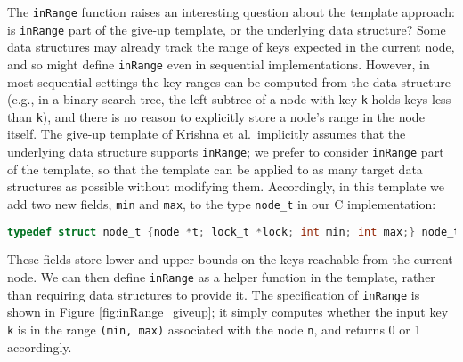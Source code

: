 \documentclass[a4paper,UKenglish,cleveref, autoref, thm-restate]{lipics-v2021}
\newcommand{\wm}[1]{\textbf{\textcolor{violet}{[William: #1]}}}
\begin{document}
The \lstinline{inRange} function raises an interesting question about the template approach: is \lstinline{inRange} part of the give-up template, or the underlying data structure? Some data structures may already track the range of keys expected in the current node, and so might define \lstinline{inRange} even in sequential implementations. However, in most sequential settings the key ranges can be computed from the data structure (e.g., in a binary search tree, the left subtree of a node with key \lstinline{k} holds keys less than \lstinline{k}), and there is no reason to explicitly store a node's range in the node itself. The give-up template of Krishna et al.~implicitly assumes that the underlying data structure supports \lstinline{inRange}; we prefer to consider \lstinline{inRange} part of the template, so that the template can be applied to as many target data structures as possible without modifying them. Accordingly, in this template we add two new fields, \lstinline{min} and \lstinline{max}, to the type \lstinline{node_t} in our C implementation:
\begin{lstlisting}[language = C, backgroundcolor=\color{white}, basicstyle=\ttfamily\footnotesize]
	typedef struct node_t {node *t; lock_t *lock; int min; int max;} node_t;
\end{lstlisting}
These fields store lower and upper bounds on the keys reachable from the current node. %
We can then define \texttt{inRange} as a helper function in the template, rather than requiring data structures to provide it. %
The specification of \lstinline{inRange} is shown in Figure \ref{fig:inRange_giveup}; it simply computes whether the input key \lstinline{k} is in the range \texttt{(min, max)} associated with the node \texttt{n}, and returns 0 or 1 accordingly.
\end{document}
